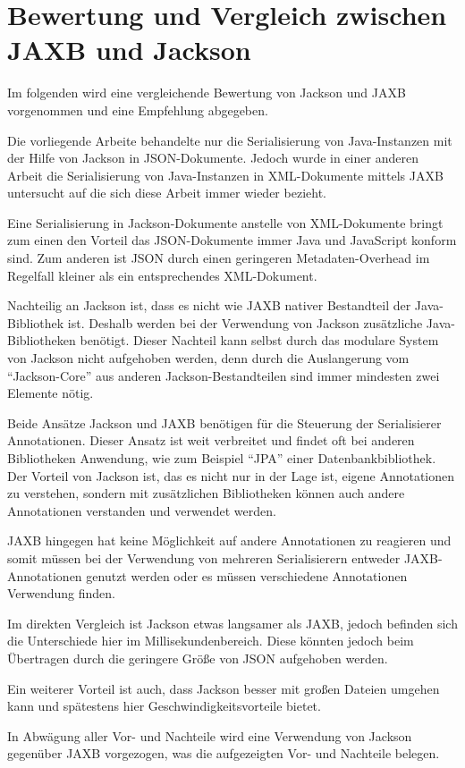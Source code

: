 \section{Bewertung und Vergleich zwischen JAXB und Jackson}
Im folgenden wird eine vergleichende Bewertung von Jackson und JAXB vorgenommen und eine Empfehlung abgegeben.

Die vorliegende Arbeite behandelte nur die Serialisierung von Java-Instanzen mit der Hilfe von Jackson in JSON-Dokumente. Jedoch wurde in einer anderen Arbeit die Serialisierung von Java-Instanzen in XML-Dokumente mittels JAXB untersucht auf die sich diese Arbeit immer wieder bezieht.\cite{Wal14}

Eine Serialisierung in Jackson-Dokumente anstelle von XML-Dokumente bringt zum einen den Vorteil das JSON-Dokumente immer Java und JavaScript konform sind. Zum anderen ist JSON durch einen geringeren Metadaten-Overhead im Regelfall kleiner als ein entsprechendes XML-Dokument. 

Nachteilig an Jackson ist, dass es nicht wie JAXB nativer Bestandteil der Java-Bibliothek ist. Deshalb werden bei der Verwendung von Jackson zus\"atzliche Java-Bibliotheken ben\"otigt. Dieser Nachteil kann selbst durch das modulare System von Jackson nicht aufgehoben werden, denn durch die Auslangerung vom "`Jackson-Core"' aus anderen Jackson-Bestandteilen sind immer mindesten zwei Elemente n\"otig. 

Beide Ans\"atze Jackson und JAXB ben\"otigen f\"ur die Steuerung der Serialisierer Annotationen. Dieser Ansatz ist weit verbreitet und findet oft bei anderen Bibliotheken Anwendung, wie zum Beispiel "`JPA"' einer Datenbankbibliothek. Der Vorteil von Jackson ist, das es nicht nur in der Lage ist, eigene Annotationen zu verstehen, sondern mit zus\"atzlichen Bibliotheken k\"onnen auch andere Annotationen verstanden und verwendet werden. 

JAXB hingegen hat keine M\"oglichkeit auf andere Annotationen zu reagieren und somit m\"ussen bei der Verwendung von mehreren Serialisierern entweder JAXB-Annotationen genutzt werden oder es m\"ussen verschiedene Annotationen Verwendung finden.

Im direkten Vergleich ist Jackson etwas langsamer als JAXB, jedoch befinden sich die Unterschiede hier im Millisekundenbereich. Diese k\"onnten jedoch beim \"Ubertragen durch die geringere Gr\"o\ss{}e von JSON aufgehoben werden.

Ein weiterer Vorteil ist auch, dass Jackson besser mit gro\ss{}en Dateien umgehen kann und sp\"atestens hier Geschwindigkeitsvorteile bietet.

In Abw\"agung aller Vor- und Nachteile wird eine Verwendung von Jackson gegen\"uber JAXB vorgezogen, was die aufgezeigten Vor- und Nachteile belegen.